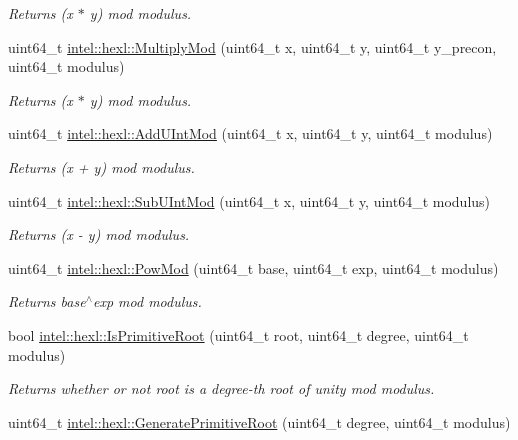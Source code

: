 \begin{DoxyCompactItemize}
\begin{DoxyCompactList}\small\item\em Returns (x $\ast$ y) mod modulus. \end{DoxyCompactList}\item 
uint64\+\_\+t \hyperlink{namespaceintel_1_1hexl_a0b3d06107428b15f58be1680fbf1656d}{intel\+::hexl\+::\+Multiply\+Mod} (uint64\+\_\+t x, uint64\+\_\+t y, uint64\+\_\+t y\+\_\+precon, uint64\+\_\+t modulus)
\begin{DoxyCompactList}\small\item\em Returns (x $\ast$ y) mod modulus. \end{DoxyCompactList}\item 
uint64\+\_\+t \hyperlink{namespaceintel_1_1hexl_ad16852e2b8114cd9c22dd25593c76f99}{intel\+::hexl\+::\+Add\+U\+Int\+Mod} (uint64\+\_\+t x, uint64\+\_\+t y, uint64\+\_\+t modulus)
\begin{DoxyCompactList}\small\item\em Returns (x + y) mod modulus. \end{DoxyCompactList}\item 
uint64\+\_\+t \hyperlink{namespaceintel_1_1hexl_a4411ec648d83bfbc3ecaf96859576054}{intel\+::hexl\+::\+Sub\+U\+Int\+Mod} (uint64\+\_\+t x, uint64\+\_\+t y, uint64\+\_\+t modulus)
\begin{DoxyCompactList}\small\item\em Returns (x -\/ y) mod modulus. \end{DoxyCompactList}\item 
uint64\+\_\+t \hyperlink{namespaceintel_1_1hexl_aff7287aeef7fdb27e6ffb254adb40477}{intel\+::hexl\+::\+Pow\+Mod} (uint64\+\_\+t base, uint64\+\_\+t exp, uint64\+\_\+t modulus)
\begin{DoxyCompactList}\small\item\em Returns base$^\wedge$exp mod modulus. \end{DoxyCompactList}\item 
bool \hyperlink{namespaceintel_1_1hexl_a8b04aa9aed381d3c976d953efbe0a4b6}{intel\+::hexl\+::\+Is\+Primitive\+Root} (uint64\+\_\+t root, uint64\+\_\+t degree, uint64\+\_\+t modulus)
\begin{DoxyCompactList}\small\item\em Returns whether or not root is a degree-\/th root of unity mod modulus. \end{DoxyCompactList}\item 
uint64\+\_\+t \hyperlink{namespaceintel_1_1hexl_a130d3fb9218c1aaa9fbeb5d143eb288b}{intel\+::hexl\+::\+Generate\+Primitive\+Root} (uint64\+\_\+t degree, uint64\+\_\+t modulus)

\end{DoxyCompactItemize}

